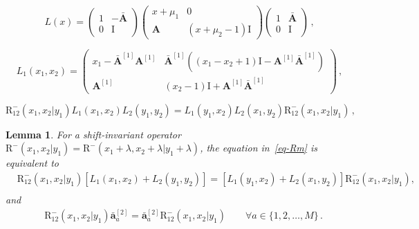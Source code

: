 \documentclass[10pt,a4paper]{amsart}
\newtheorem{lemma}{Lemma}
\newcommand{\ID}{\mathrm{I}}
\newcommand{\M}{M}
\newcommand{\OA}{\mathbf{A}}
\newcommand{\OAD}{\mathbf{\bar{A}}}
\newcommand{\abrOSCR}{\mathrm{R}}
\newcommand{\mmu}{\mu}
\newcommand{\oad}{\mathbf{\bar{a}}}
\begin{document}
	\begin{equation}\label{eq:laxfac}
		L(x)=\left(\begin{array}{cc}
			1&-\OAD\\
			0&\ID
		\end{array}\right)\left(\begin{array}{cc}
			x+\mmu_1&0\\
			\OA&(x+\mmu_2-1)\ID
		\end{array}\right)\left(\begin{array}{cc}
			1&\OAD\\
			0&\ID
		\end{array}\right)\,,
	\end{equation}

		\begin{equation}\label{L1-u1u2}
			L_{1}(x_{1},x_{2})= \left(\begin{array}{cc}
			x_{1}-\OAD^{[1]}\OA^{[1]}&	\OAD^{[1]}\left((x_{1}-x_{2}+1)\ID-\OA^{[1]}\OAD^{[1]}\right)\\
				\OA^{[1]}&(x_{2}-1)\ID+\OA^{[1]}\OAD^{[1]}
			\end{array}\right) \,,
		\end{equation}

		\begin{equation}\label{eq-Rm}
			{\abrOSCR}^-_{12}(x_1,x_2|y_1) L_1(x_1,x_2)L_2(y_1,y_2)=L_1(y_1,x_2)L_2(x_1,y_2){\abrOSCR}^-_{12}(x_1,x_2|y_1)\,,
		\end{equation} 

\begin{lemma}\label{Lemma-equivalence}
	For a shift-invariant operator $\abrOSCR^{-}(x_1,x_2|y_1)=\abrOSCR^{-}(x_1+\lambda,x_2+\lambda|y_1+\lambda)$, the equation in~\eqref{eq-Rm} is equivalent to
	\begin{equation}\label{goal-2a}
		\begin{split}
			&\abrOSCR_{12}^{-}(x_1,x_2|y_1)\left[L_{1}(x_{1},x_{2})+L_{2}(y_{1},y_{2})\right]=\left[L_{1}(y_{1},x_{2})+L_{2}(x_{1},y_{2})\right]\abrOSCR_{12}^{-}(x_1,x_2|y_1),\\
			\end{split}
	\end{equation}
	and
	\begin{equation}\label{goal-2b}
		\begin{split}
			&\abrOSCR_{12}^{-}(x_1,x_2|y_1)\oad_{a}^{[2]}=\oad^{[2]}_a\abrOSCR_{12}^{-}(x_1,x_2|y_1)\qquad \forall a\in \{1,2,\ldots,\M\}\,.
		\end{split}
	\end{equation}
\end{lemma}
\end{document}

